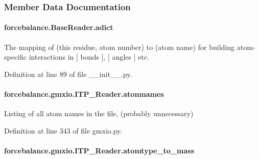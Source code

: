 \subsubsection{Member Data Documentation}
\hypertarget{classforcebalance_1_1BaseReader_a2c46ad6b66cf09a30e917ce4a1997e2a}{
\paragraph[{adict}]{\setlength{\rightskip}{0pt plus 5cm}forcebalance.\-Base\-Reader.\-adict\hspace{0.3cm}{\ttfamily [inherited]}}}\label{classforcebalance_1_1BaseReader_a2c46ad6b66cf09a30e917ce4a1997e2a}


The mapping of (this residue, atom number) to (atom name) for building atom-\/specific interactions in \mbox{[} bonds \mbox{]}, \mbox{[} angles \mbox{]} etc. 



Definition at line 89 of file \-\_\-\-\_\-init\-\_\-\-\_\-.\-py.

\hypertarget{classforcebalance_1_1gmxio_1_1ITP__Reader_a0cbe42a9c0bf233255cfb8dd6ebe102e}{
\paragraph[{atomnames}]{\setlength{\rightskip}{0pt plus 5cm}forcebalance.\-gmxio.\-I\-T\-P\-\_\-\-Reader.\-atomnames}}\label{classforcebalance_1_1gmxio_1_1ITP__Reader_a0cbe42a9c0bf233255cfb8dd6ebe102e}


Listing of all atom names in the file, (probably unnecessary) 



Definition at line 343 of file gmxio.\-py.

\hypertarget{classforcebalance_1_1gmxio_1_1ITP__Reader_ae4ae7fb78a864a7ca15f68b376e84c35}{
\paragraph[{atomtype\-\_\-to\-\_\-mass}]{\setlength{\rightskip}{0pt plus 5cm}forcebalance.\-gmxio.\-I\-T\-P\-\_\-\-Reader.\-atomtype\-\_\-to\-\_\-mass}}\label{classforcebalance_1_1gmxio_1_1ITP__Reader_ae4ae7fb78a864a7ca15f68b376e84c35}


